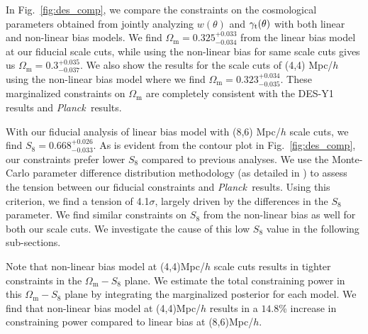 \documentclass[fleqn,usenatbib]{mnras}
\newcommand{\gammat}{\ensuremath{\gamma_{\rm t}(\theta)}}
\newcommand{\wtheta}{\ensuremath{w(\theta)}}
\newcommand{\om}{\ensuremath{\Omega_{\mathrm m}}}
\newcommand{\Planck}{{\slshape Planck~}}
\begin{document}
In Fig.~\ref{fig:des_comp}, we compare the constraints on the cosmological parameters obtained from jointly analyzing $\wtheta$ and $\gammat$ with both linear and non-linear bias models. We find $\om = 0.325^{+0.033}_{-0.034}$ from the linear bias model at our fiducial scale cuts, while using the non-linear bias for same scale cuts gives us $\om = 0.3^{+0.035}_{-0.037}$. We also show the results for the scale cuts of (4,4) Mpc/$h$ using the non-linear bias model where we find $\om=0.323^{+0.034}_{-0.035}$. These marginalized constraints on $\om$ are completely consistent with the DES-Y1 results and \Planck results. 

With our fiducial analysis of linear bias model with (8,6) Mpc/$h$ scale cuts, we find $S_8 = 0.668^{+0.026}_{-0.033}$. As is evident from the contour plot in Fig.~\ref{fig:des_comp}, our constraints prefer lower $S_8$ compared to previous analyses.  We use the Monte-Carlo parameter difference distribution methodology (as detailed in \cite{y3-tensions}) to assess the tension between our fiducial constraints and \Planck results. Using this criterion, we find a tension of 4.1$\sigma$, largely driven by the differences in the $S_8$ parameter. We find similar constraints on $S_8$ from the non-linear bias as well for both our scale cuts. We investigate the cause of this low $S_8$ value in the following sub-sections. 

Note that non-linear bias model at (4,4)Mpc/$h$ scale cuts results in tighter constraints in the $\om-S_8$ plane. We estimate the total constraining power in this $\om-S_8$ plane by integrating the marginalized posterior for each model. 
We find that non-linear bias model at  (4,4)Mpc/$h$ results in a $14.8$\% increase in constraining power compared to linear bias at (8,6)Mpc/$h$. 
\end{document}
